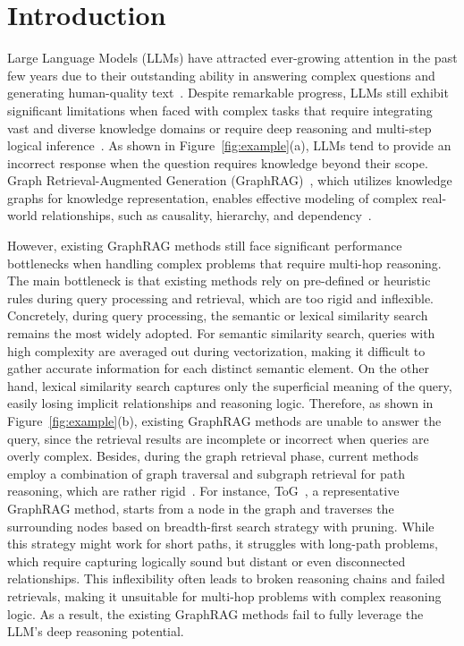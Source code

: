 \section{Introduction}
Large Language Models (LLMs) have attracted ever-growing attention in the past few years due to their outstanding ability in answering complex questions and generating human-quality text~\cite{vaswani2017attention,wang2024current}.
Despite remarkable progress, LLMs still exhibit significant limitations when faced with complex tasks that require integrating vast and diverse knowledge domains or require deep reasoning and multi-step logical inference~\cite{talmor2019commonsenseqa,petroni2021kilt}. 
As shown in Figure~\ref{fig:example}(a), LLMs tend to provide an incorrect response when the question
requires knowledge beyond their scope.  
Graph Retrieval-Augmented Generation (GraphRAG)~\cite{xiang2025use,zhangsurvey,pengsurvey,hansurvey,zhu2024structugraphrag,li2025g}, which utilizes knowledge graphs for knowledge representation, enables effective modeling of complex real-world relationships, such as causality, hierarchy, and dependency~\cite{micro_graphrag,pengsurvey}.

However, existing GraphRAG methods still face significant performance bottlenecks when handling complex problems that require multi-hop reasoning. The main bottleneck is that existing methods rely on pre-defined or heuristic rules during query processing and retrieval, which are too rigid and inflexible. Concretely, during query processing, the semantic or lexical similarity search~\cite{hansurvey,gao2023retrieval,fan2024survey} remains the most widely adopted. For semantic similarity search, queries with high complexity are averaged out during vectorization, making it difficult to gather accurate information for each distinct semantic element. On the other hand, lexical similarity search captures only the superficial meaning of the query, easily losing implicit relationships and reasoning logic. Therefore, as shown in Figure~\ref{fig:example}(b), existing GraphRAG methods are unable to answer the query, since the retrieval results are incomplete or incorrect when queries are overly complex.
Besides, during the graph retrieval phase, current methods employ a combination of graph traversal and subgraph retrieval for path reasoning, which are rather rigid~\cite{tog,tog2,jimenez2024hipporag,guo2024lightrag,li2024graphreader}. For instance, ToG~\cite{tog,tog2}, a representative GraphRAG method, starts from a node in the graph and traverses the surrounding nodes based on breadth-first search strategy with pruning. While this strategy might work for short paths, it struggles with long-path problems, which require capturing logically sound but distant or even disconnected relationships. 
This inflexibility often leads to broken reasoning chains and failed retrievals, making it unsuitable for multi-hop problems with complex reasoning logic.
As a result, the existing GraphRAG methods fail to fully leverage the LLM's deep reasoning potential.%


